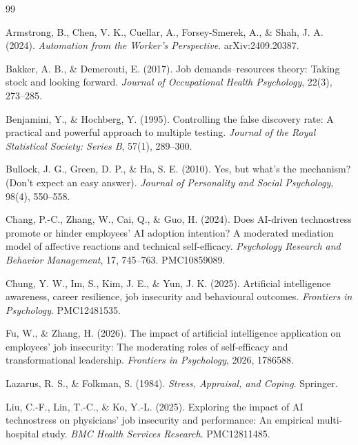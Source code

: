 \documentclass[11pt]{article}
\begin{document}

\begin{thebibliography}{99}

Armstrong, B., Chen, V. K., Cuellar, A., Forsey-Smerek, A., \& Shah, J. A. (2024).
\textit{Automation from the Worker's Perspective}.
arXiv:2409.20387.

Bakker, A. B., \& Demerouti, E. (2017).
Job demands--resources theory: Taking stock and looking forward.
\textit{Journal of Occupational Health Psychology}, 22(3), 273--285.

Benjamini, Y., \& Hochberg, Y. (1995).
Controlling the false discovery rate: A practical and powerful approach to multiple testing.
\textit{Journal of the Royal Statistical Society: Series B}, 57(1), 289--300.

Bullock, J. G., Green, D. P., \& Ha, S. E. (2010).
Yes, but what's the mechanism? (Don't expect an easy answer).
\textit{Journal of Personality and Social Psychology}, 98(4), 550--558.

Chang, P.-C., Zhang, W., Cai, Q., \& Guo, H. (2024).
Does AI-driven technostress promote or hinder employees' AI adoption intention?
A moderated mediation model of affective reactions and technical self-efficacy.
\textit{Psychology Research and Behavior Management}, 17, 745--763.
PMC10859089.

Chung, Y. W., Im, S., Kim, J. E., \& Yun, J. K. (2025).
Artificial intelligence awareness, career resilience, job insecurity and behavioural outcomes.
\textit{Frontiers in Psychology}.
PMC12481535.

Fu, W., \& Zhang, H. (2026).
The impact of artificial intelligence application on employees' job insecurity:
The moderating roles of self-efficacy and transformational leadership.
\textit{Frontiers in Psychology}, 2026, 1786588.

Lazarus, R. S., \& Folkman, S. (1984).
\textit{Stress, Appraisal, and Coping}.
Springer.

Liu, C.-F., Lin, T.-C., \& Ko, Y.-L. (2025).
Exploring the impact of AI technostress on physicians' job insecurity and performance:
An empirical multi-hospital study.
\textit{BMC Health Services Research}.
PMC12811485.


\end{thebibliography}
\end{document}
